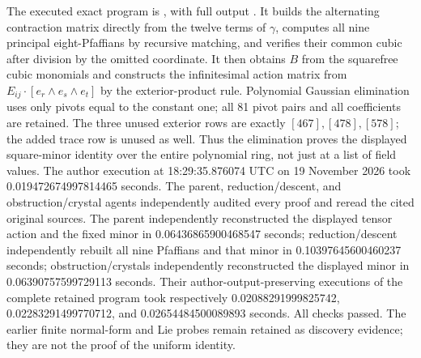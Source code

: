 \begin{remark}
\label{rem:p-rank-zero-polar-unit-certificate-candidate}
The executed exact program is
,
with full output
.
It builds the alternating contraction matrix directly from the twelve
terms of $\gamma$, computes all nine principal eight-Pfaffians by
recursive matching, and verifies their common cubic after division
by the omitted coordinate. It then obtains $B$ from the squarefree
cubic monomials and constructs the infinitesimal action matrix from
$E_{ij}\cdot[e_r\wedge e_s\wedge e_t]$ by the exterior-product rule.
Polynomial Gaussian elimination uses only pivots equal to the constant
one; all 81 pivot pairs and all coefficients are retained.
The three unused exterior rows are exactly $[467],[478],[578]$;
the added trace row is unused as well. Thus the elimination proves
the displayed square-minor identity over the entire polynomial ring,
not just at a list of field values. The author execution at
18:29:35.876074 UTC on 19 November 2026 took
0.019472674997814465 seconds. The parent, reduction/descent, and obstruction/crystal agents independently
audited every proof and reread the cited original sources. The parent
independently reconstructed the displayed tensor action and the fixed minor
in 0.06436865900468547 seconds; reduction/descent independently rebuilt
all nine Pfaffians and that minor in 0.10397645600460237 seconds;
obstruction/crystals independently reconstructed the displayed minor
in 0.06390757599729113 seconds. Their author-output-preserving executions
of the complete retained program took respectively
0.02088291999825742, 0.02283291499770712, and
0.02654484500089893 seconds. All checks passed.
The earlier finite normal-form and Lie probes remain retained as
discovery evidence; they are not the proof of the uniform identity.
\end{remark}

